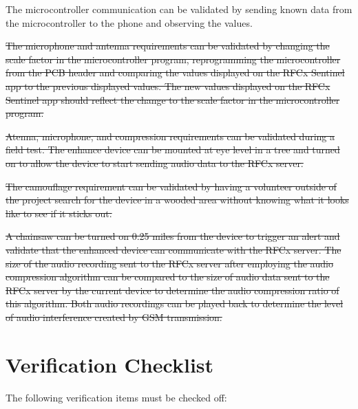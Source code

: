 \documentclass{article}
\numberwithin{figure}{section}
\numberwithin{equation}{section}
\begin{document}
{The microcontroller communication can be validated by sending known data from the microcontroller to the phone and observing the values.

\bigskip

\sout{The microphone and antenna requirements can be validated by changing the scale factor in the microcontroller program, reprogramming the microcontroller from the PCB header and comparing the values displayed on the RFCx Sentinel app to the previous displayed values. The new values displayed on the RFCx Sentinel app should reflect the change to the scale factor in the microcontroller program.}

\bigskip

\sout{Atenna, microphone, and compression requirements can be validated during a field test. The enhance device can be mounted at eye level in a tree and turned on to allow the device to start sending audio data to the RFCx server.}

\bigskip

\sout{The camouflage requirement can be validated by having a volunteer outside of the project search for the device in a wooded area without knowing what it looks like to see if it sticks out.}

\bigskip

\sout{A chainsaw can be turned on 0.25 miles from the device to trigger an alert and validate that the enhanced device can communicate with the RFCx server. The size of the audio recording sent to the RFCx server after employing the audio compression algorithm can be compared to the size of audio data sent to the RFCx server by the current device to determine the audio compression ratio of this algorithm. Both audio recordings can be played back to determine the level of audio interference created by GSM transmission.}

\section{Verification Checklist} \label{sect:verification_chk}
The following verification items must be checked off:

}
\end{document}
